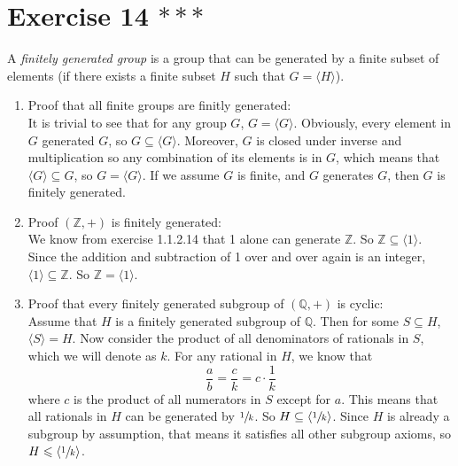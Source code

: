 \documentclass{article}
\newcommand{\Z}{\mathbb{Z}}
\newcommand{\Q}{\mathbb{Q}}
\newcommand{\seq}{\leqslant}
\newcommand{\sub}{\subseteq}
\begin{document}
    \section*{Exercise 14 $***$}
    A \textit{finitely generated group} is a group that can be generated
    by a finite subset of elements
    (if there exists a finite subset $H$ such that $G = \langle H \rangle$).
    \begin{enumerate}[label=\textbf{\alph*.}]
        \item 
            Proof that all finite groups are finitly generated: \\
            It is trivial to see that for any group $G$,
            $G = \langle G \rangle$.
            Obviously, every element in $G$ generated $G$,
            so $G \sub \langle G \rangle$.
            Moreover, $G$ is closed under inverse and multiplication
            so any combination of its elements is in $G$,
            which means that $\langle G \rangle \sub G$,
            so $G = \langle G \rangle$.
            If we assume $G$ is finite,
            and $G$ generates $G$,
            then $G$ is finitely generated.
        \item 
            Proof $(\Z, +)$ is finitely generated: \\
            We know from exercise 1.1.2.14 that 1 alone can generate $\Z$.
            So $\Z \sub \langle 1 \rangle$.
            Since the addition and subtraction of 1 over and over again
            is an integer,
            $\langle 1 \rangle \sub \Z$.
            So $\Z = \langle 1 \rangle$.
        \item
            Proof that every finitely generated subgroup of $(\Q, +)$
            is cyclic: \\
            Assume that $H$ is a finitely generated subgroup of $\Q$.
            Then for some $S \sub H$,
            $\langle S \rangle = H$.
            Now consider the product of all denominators of rationals in $S$,
            which we will denote as $k$.
            For any rational in $H$,
            we know that 
            \[ \dfrac{a}{b} = \dfrac{c}{k} = c \cdot \dfrac{1}{k} \]
            where $c$ is the product of all numerators in $S$
            except for $a$.
            This means that all rationals in $H$
            can be generated by $\sfrac{1}{k}$.
            So $H \sub \langle \sfrac{1}{k} \rangle$.
            Since $H$ is already a subgroup by assumption,
            that means it satisfies all other subgroup axioms,
            so $H \seq \langle \sfrac{1}{k} \rangle$.

\end{enumerate}
\end{document}
